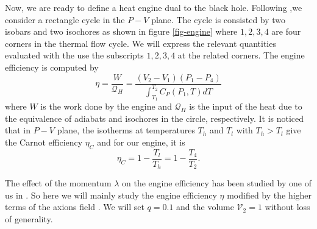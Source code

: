 \documentclass[preprint,showpacs,showkeys,onecolumn,nofootinbib]{revtex4}
\begin{document}
Now, we are ready to define a heat engine dual to the black hole. Following \cite{Johnson:2015fva,Hennigar:2017apu,Xu:2017ahm,Johnson:2017ood,Mo:2017nhw,Liu:2017baz,Wei:2016hkm},we consider a rectangle cycle in the $P-V$ plane. The cycle is consisted by two isobars and two isochores as shown in figure \ref{fig-engine} where  $1,2,3,4$ are four corners in the thermal flow cycle.  We will  express the relevant quantities evaluated with the use the subscripts $1, 2, 3, 4$  at the related corners. The engine efficiency is computed by
\begin{equation}
\label{eq-eta}\eta=\frac{W}{\mathcal{Q}_H}=\frac{(V_2-V_1)(P_1-P_4)}{\int_{T_1}^{T_2} C_P(P_1,T) dT}
\end{equation}
where  $W$ is the work done by the engine and $\mathcal{Q}_H$ is the input of the heat
due to the equivalence of adiabats and isochores in the circle, respectively.
It is noticed  that in $P-V$ plane, the isotherms at temperatures $T_h$ and $T_l$ with $T_h>T_l$ give the Carnot efficiency $\eta_C$ and for our engine,  it is
\begin{equation}
\eta_C=1-\frac{T_l}{T_h}=1-\frac{T_4}{T_2}.
\end{equation}

The effect of the momentum  $\lambda$ on the engine efficiency has been studied by one of us in \cite{Fang:2017nse}. So here we will mainly study the engine efficiency  $\eta$ modified by the higher terms of the axions field . We will set $q=0.1$ and the volume $\mathcal{V}_{2}=1$ without loss of generality.
\end{document}
